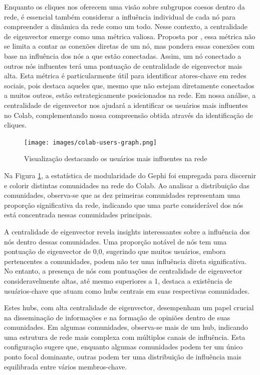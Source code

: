 Enquanto os cliques nos oferecem uma visão sobre subgrupos coesos dentro da rede, é essencial também considerar a influência individual de cada nó para compreender a dinâmica da rede como um todo. Nesse contexto, a centralidade de eigenvector emerge como uma métrica valiosa. Proposta por , essa métrica não se limita a contar as conexões diretas de um nó, mas pondera essas conexões com base na influência dos nós a que estão conectadas. Assim, um nó conectado a outros nós influentes terá uma pontuação de centralidade de eigenvector mais alta. Esta métrica é particularmente útil para identificar atores-chave em redes sociais, pois destaca aqueles que, mesmo que não estejam diretamente conectados a muitos outros, estão estrategicamente posicionados na rede. Em nossa análise, a centralidade de eigenvector nos ajudará a identificar os usuários mais influentes no Colab, complementando nossa compreensão obtida através da identificação de cliques.

\begin{figure}[!hbtp]
	\caption{Visualização destacando os usuários mais influentes na rede}
	\label{fig:colab_users_graph}
	\centering
	\texttt{[image: images/colab-users-graph.png]}
	\fautor
\end{figure}

Na Figura \ref{fig:colab_users_graph}, a estatística de modularidade do Gephi foi empregada para discernir e colorir distintas comunidades na rede do Colab. Ao analisar a distribuição das comunidades, observa-se que as dez primeiras comunidades representam uma proporção significativa da rede, indicando que uma parte considerável dos nós está concentrada nessas comunidades principais.

A centralidade de eigenvector revela insights interessantes sobre a influência dos nós dentro dessas comunidades. Uma proporção notável de nós tem uma pontuação de eigenvector de 0,0, sugerindo que muitos usuários, embora pertencentes a comunidades, podem não ter uma influência direta significativa. No entanto, a presença de nós com pontuações de centralidade de eigenvector consideravelmente altas, até mesmo superiores a 1, destaca a existência de usuários-chave que atuam como hubs centrais em suas respectivas comunidades.

Estes hubs, com alta centralidade de eigenvector, desempenham um papel crucial na disseminação de informações e na formação de opiniões dentro de suas comunidades. Em algumas comunidades, observa-se mais de um hub, indicando uma estrutura de rede mais complexa com múltiplos canais de influência. Esta configuração sugere que, enquanto algumas comunidades podem ter um único ponto focal dominante, outras podem ter uma distribuição de influência mais equilibrada entre vários membros-chave.


